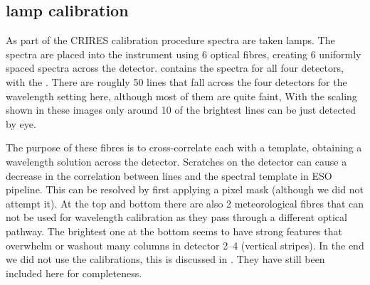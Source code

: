 

\subsection{\thar{} lamp calibration}
\label{subsec:th-ar}
As part of the CRIRES calibration procedure spectra are taken \thar{} lamps. The \thar{} spectra are placed into the instrument using 6 optical fibres, creating 6 uniformly spaced spectra across the detector.
 contains the \thar{} spectra for all four detectors, with the \thar{}. There are roughly 50 \thar{} lines that fall across the four detectors for the wavelength setting here, although most of them are quite faint, With the scaling shown in these images only around 10 of the brightest lines can be just detected by eye.

The purpose of these fibres is to cross-correlate each with a \thar{} template, obtaining a wavelength solution across the detector. Scratches on the detector can cause a decrease in the correlation between \thar{} lines and the spectral template in ESO pipeline. This can be resolved by first applying a pixel mask (although we did not attempt it). At the top and bottom there are also 2 meteorological fibres that can not be used for wavelength calibration as they pass through a different optical pathway.  The brightest one at the bottom seems to have strong features that overwhelm or washout many columns in detector 2--4 (vertical stripes). 
In the end we did not use the \thar{} calibrations, this is discussed in . They have still been included here for completeness.


